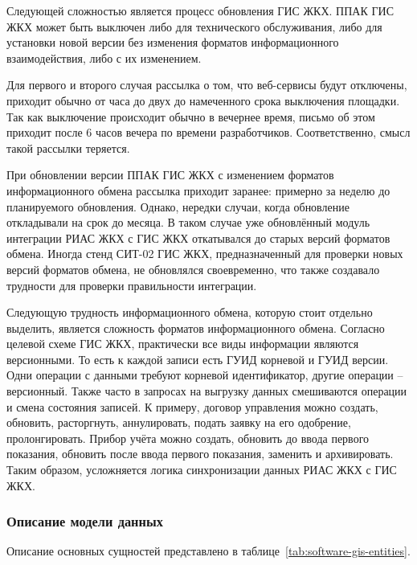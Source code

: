 Следующей сложностью является процесс обновления ГИС ЖКХ.
ППАК ГИС ЖКХ может быть выключен либо для технического обслуживания, либо для установки новой версии без изменения форматов информационного взаимодействия, либо с их изменением.

Для первого и второго случая рассылка о том, что веб-сервисы будут отключены, приходит обычно от часа до двух до намеченного срока выключения площадки.
Так как выключение происходит обычно в вечернее время, письмо об этом приходит после 6 часов вечера по времени разработчиков.
Соответственно, смысл такой рассылки теряется.

При обновлении версии ППАК ГИС ЖКХ с изменением форматов информационного обмена рассылка приходит заранее: примерно за неделю до планируемого обновления.
Однако, нередки случаи, когда обновление откладывали на срок до месяца.
В таком случае уже обновлённый модуль интеграции РИАС ЖКХ с ГИС ЖКХ откатывался до старых версий форматов обмена.
Иногда стенд СИТ-02 ГИС ЖКХ, предназначенный для проверки новых версий форматов обмена, не обновлялся своевременно, что также создавало трудности для проверки правильности интеграции.

Следующую трудность информационного обмена, которую стоит отдельно выделить, является сложность форматов информационного обмена.
Согласно целевой схеме ГИС ЖКХ, практически все виды информации являются версионными.
То есть к каждой записи есть ГУИД корневой и ГУИД версии.
Одни операции с данными требуют корневой идентификатор, другие операции -- версионный.
Также часто в запросах на выгрузку данных смешиваются операции и смена состояния записей.
К примеру, договор управления можно создать, обновить, расторгнуть, аннулировать, подать заявку на его одобрение, пролонгировать.
Прибор учёта можно создать, обновить до ввода первого показания, обновить после ввода первого показания, заменить и архивировать.
Таким образом, усложняется логика синхронизации данных РИАС ЖКХ с ГИС ЖКХ.

\subsubsection{Описание модели данных}
\label{head:software-gis-entities}

Описание основных сущностей представлено в таблице~\ref{tab:software-gis-entities}.

